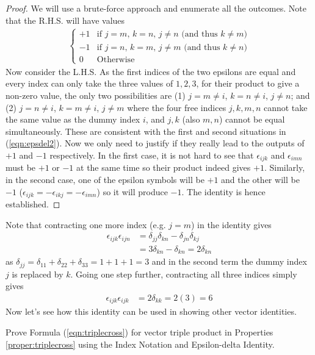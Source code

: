 \begin{proof}
We will use a brute-force approach and enumerate all the outcomes. Note that the R.H.S. will have values 
\begin{align}
\begin{cases}
+1 & \text{if $j=m$, $k=n$, $j\neq n$ (and thus $k\neq m$)} \\
-1 & \text{if $j=n$, $k=m$, $j\neq m$ (and thus $k\neq n$)} \\
0 & \text{Otherwise}
\end{cases}
\label{eqn:epsdel2}
\end{align}
Now consider the L.H.S. As the first indices of the two epsilons are equal and every index can only take the three values of $1,2,3$, for their product to give a non-zero value, the only two possibilities are (1) $j = m \neq i$, $k = n \neq i$, $j \neq n$; and (2) $j = n \neq i$, $k = m \neq i$, $j \neq m$ where the four free indices $j,k,m,n$ cannot take the same value as the dummy index $i$, and $j,k$ (also $m,n$) cannot be equal simultaneously. These are consistent with the first and second situations in (\ref{eqn:epsdel2}). Now we only need to justify if they really lead to the outputs of $+1$ and $-1$ respectively. In the first case, it is not hard to see that $\epsilon_{ijk}$ and $\epsilon_{imn}$ must be $+1$ or $-1$ at the same time so their product indeed gives $+1$. Similarly, in the second case, one of the epsilon symbols will be $+1$ and the other will be $-1$ ($\epsilon_{ijk} = -\epsilon_{ikj} = -\epsilon_{imn}$) so it will produce $-1$. The identity is hence established.
\end{proof}
Note that contracting one more index (e.g. $j=m$) in the identity gives
\begin{align}
\epsilon_{ijk}\epsilon_{ijn} &= \delta_{jj}\delta_{kn} - \delta_{jn}\delta_{kj} \nonumber \\
&= 3\delta_{kn} - \delta_{kn} = 2\delta_{kn}
\end{align}
as $\delta_{jj} = \delta_{11} + \delta_{22} + \delta_{33} = 1+1+1 = 3$ and in the second term the dummy index $j$ is replaced by $k$. Going one step further, contracting all three indices simply gives
\begin{align}
\epsilon_{ijk}\epsilon_{ijk} &= 2\delta_{kk} = 2(3) = 6
\end{align}
Now let's see how this identity can be used in showing other vector identities.
\begin{exmp}
Prove Formula (\ref{eqn:triplecross}) for vector triple product in Properties \ref{proper:triplecross} using the Index Notation and Epsilon-delta Identity.
\end{exmp}
